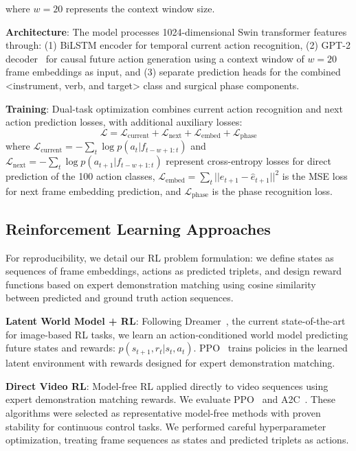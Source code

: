 \documentclass[runningheads]{llncs}
\begin{document}
where $w=20$ represents the context window size.

\textbf{Architecture}: The model processes 1024-dimensional Swin transformer features~\cite{liu2021swin} through: (1) BiLSTM encoder for temporal current action recognition, (2) GPT-2 decoder~\cite{radford2019language} for causal future action generation using a context window of $w=20$ frame embeddings as input, and (3) separate prediction heads for the combined <instrument, verb, and target> class and surgical phase components.

\textbf{Training}: Dual-task optimization combines current action recognition and next action prediction losses, with additional auxiliary losses:
\begin{equation}
\mathcal{L} = \mathcal{L}_{\text{current}} + \mathcal{L}_{\text{next}} + \mathcal{L}_{\text{embed}} + \mathcal{L}_{\text{phase}}
\end{equation}
where $\mathcal{L}_{\text{current}} = -\sum_{t} \log p(a_t|f_{t-w+1:t})$ and $\mathcal{L}_{\text{next}} = -\sum_{t} \log p(a_{t+1}|f_{t-w+1:t})$ represent cross-entropy losses for direct prediction of the 100 action classes, $\mathcal{L}_{\text{embed}} = \sum_{t} ||e_{t+1} - \hat{e}_{t+1}||^2$ is the MSE loss for next frame embedding prediction, and $\mathcal{L}_{\text{phase}}$ is the phase recognition loss.


\subsection{Reinforcement Learning Approaches}

For reproducibility, we detail our RL problem formulation: we define states as sequences of frame embeddings, actions as predicted triplets, and design reward functions based on expert demonstration matching using cosine similarity between predicted and ground truth action sequences.

\textbf{Latent World Model + RL}: Following Dreamer~\cite{hafner2020dream}, the current state-of-the-art for image-based RL tasks, we learn an action-conditioned world model predicting future states and rewards: $p(s_{t+1}, r_t|s_t, a_t)$. PPO~\cite{schulman2017proximal} trains policies in the learned latent environment with rewards designed for expert demonstration matching.

\textbf{Direct Video RL}: Model-free RL applied directly to video sequences using expert demonstration matching rewards. We evaluate PPO~\cite{schulman2017proximal} and A2C~\cite{mnih2016asynchronous}. These algorithms were selected as representative model-free methods with proven stability for continuous control tasks. We performed careful hyperparameter optimization, treating frame sequences as states and predicted triplets as actions.
\end{document}
